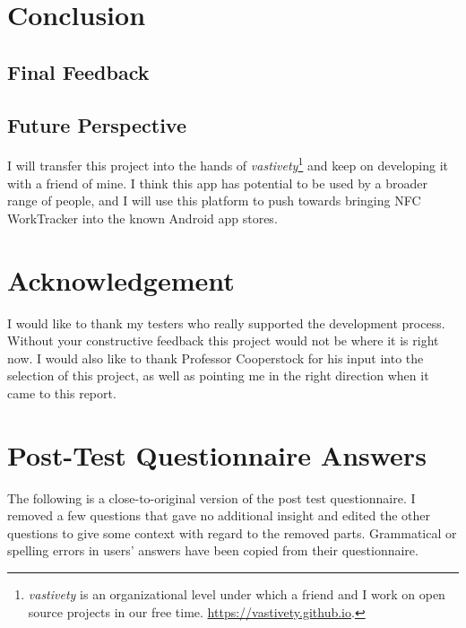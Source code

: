 \documentclass[conference]{IEEEtran}
\newcommand{\projectname}{NFC WorkTracker}
\begin{document}
\section{Conclusion}

\subsection{Final Feedback}

\subsection{Future Perspective}
I will transfer this project into the hands of \textit{vastivety}\footnote{\textit{vastivety} is an organizational level under which a friend and I work on open source projects in our free time. \url{https://vastivety.github.io}.} and keep on developing it with a friend of mine. I think this app has potential to be used by a broader range of people, and I will use this platform to push towards bringing {\projectname} into the known Android app stores.

\section*{Acknowledgement}
I would like to thank my testers who really supported the development process. Without your constructive feedback this project would not be where it is right now. I would also like to thank Professor Cooperstock for his input into the selection of this project, as well as pointing me in the right direction when it came to this report.





\appendices

\section{Post-Test Questionnaire Answers}
\label{app:questionnaire}
The following is a close-to-original version of the post test questionnaire. I removed a few questions that gave no additional insight and edited the other questions to give some context with regard to the removed parts. Grammatical or spelling errors in users' answers have been copied from their questionnaire.
\end{document}
